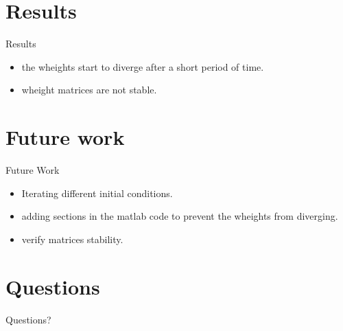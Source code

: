 \documentclass{beamer}
\begin{document}
\section{Results}
\begin{frame}{Results}
\begin{itemize}
\item the wheights start to diverge after a short period of time.
\item wheight matrices are not stable.
\end{itemize}
\end{frame}

\section{Future work}
\begin{frame}{Future Work}
\begin{itemize}
\item Iterating different initial conditions.
\item adding sections in the matlab code to prevent the wheights from diverging.
\item verify matrices stability.
\end{itemize}
\end{frame}

\section*{Questions}
\begin{frame}
\begin{LARGE}
\begin{center}
Questions?
\end{center}
\end{LARGE}
\end{frame}
\end{document}
